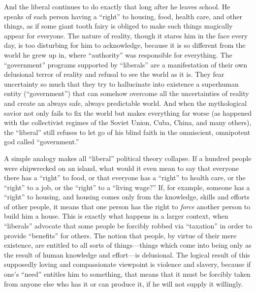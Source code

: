 \documentclass{book}
\begin{document}
And the liberal continues to do exactly that long after he leaves school. He speaks of each person having a \enquote{right} to housing, food, health care, and other things, as if some giant tooth fairy is obliged to make such things magically appear for everyone. The nature of reality, though it stares him in the face every day, is too disturbing for him to acknowledge, because it is so different from the world he grew up in, where \enquote{authority} was responsible for everything. The \enquote{government} programs supported by \enquote{liberals} are a manifestation of their own delusional terror of reality and refusal to see the world as it is. They fear uncertainty so much that they try to hallucinate into existence a superhuman entity (\enquote{government}) that can somehow overcome all the uncertainties of reality and create an always safe, always predictable world. And when the mythological savior not only fails to fix the world but makes everything far worse (as happened with the collectivist regimes of the Soviet Union, Cuba, China, and many others), the \enquote{liberal} still refuses to let go of his blind faith in the omniscient, omnipotent god called \enquote{government.}

A simple analogy makes all \enquote{liberal} political theory collapse. If a hundred people were shipwrecked on an island, what would it even mean to say that everyone there has a \enquote{right} to food, or that everyone has a \enquote{right} to health care, or the \enquote{right} to a job, or the \enquote{right} to a \enquote{living wage?} If, for example, someone has a \enquote{right} to housing, and housing comes only from the knowledge, skills and efforts of other people, it means that one person has the right to \emph{force} another person to build him a house. This is exactly what happens in a larger context, when \enquote{liberals} advocate that some people be forcibly robbed via \enquote{taxation} in order to provide \enquote{benefits} for others. The notion that people, by virtue of their mere existence, are entitled to all sorts of things---things which come into being only as the result of human knowledge and effort---is delusional. The logical result of this supposedly loving and compassionate viewpoint is violence and slavery, because if one's \enquote{need} entitles him to something, that means that it must be forcibly taken from anyone else who has it or can produce it, if he will not supply it willingly.
\end{document}
